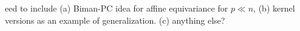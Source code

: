 \documentclass[12pt,letterpaper]{article}
\def\bredbf#1\eredbf{{\color{red}{\bf ???? #1 ????}}}
\theoremstyle{definition} \newtheorem{Definition}[Theorem]{Definition}
\begin{document}
\bredbf Need to include (a) Biman-PC idea for affine equivariance for $p \ll n$, (b) kernel versions as an example of generalization. (c) anything else? \eredbf

%
%
%
%
%
%
\end{document}
